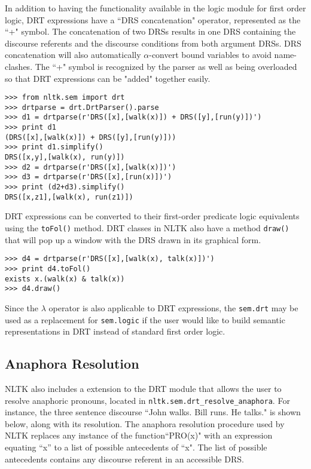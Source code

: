 \documentclass{article}
\newcommand{\dhgdrs}[2]
{
    {
    \it
    \begin{tabular}{|l|}
    \hline
    ~ \vspace{-2ex} \\
    #1
    \\
    ~ \vspace{-2ex} \\
    \hline
    ~ \vspace{-2ex} \\
    #2
    \\
    ~ \\    %
    \hline
    \end{tabular}
    }
}
\newcommand{\dhgcode}[1]{{\tt #1}}
\begin{document}
\enumsentence{\label{drt2}\dhgdrs{j,d}{(John = j)\\dog(d)\\sees(j,d)}}
\enumsentence{\label{drt3}\dhgcode{DRS([j,d],[(John = j), dog(d), sees(j,d)])}}

In addition to having the functionality available in the logic module for first order logic, DRT expressions have a ``DRS concatenation" operator, represented as the ``+" symbol.  The concatenation of two DRSs results in one DRS containing the discourse referents and the discourse conditions from both argument DRSs.  DRS concatenation will also automatically $\alpha$-convert bound variables to avoid name-clashes.  The ``+" symbol is recognized by the parser as well as being overloaded so that DRT expressions can be "added" together easily.

\begin{verbatim}
>>> from nltk.sem import drt
>>> drtparse = drt.DrtParser().parse
>>> d1 = drtparse(r'DRS([x],[walk(x)]) + DRS([y],[run(y)])')
>>> print d1
(DRS([x],[walk(x)]) + DRS([y],[run(y)]))
>>> print d1.simplify()
DRS([x,y],[walk(x), run(y)])
>>> d2 = drtparse(r'DRS([x],[walk(x)])')
>>> d3 = drtparse(r'DRS([x],[run(x)])')
>>> print (d2+d3).simplify()
DRS([x,z1],[walk(x), run(z1)])
\end{verbatim}

DRT expressions can be converted to their first-order predicate logic equivalents using the \dhgcode{toFol()} method.  DRT classes in NLTK also have a method \dhgcode{draw()} that will pop up a window with the DRS drawn in its graphical form.

\begin{verbatim}
>>> d4 = drtparse(r'DRS([x],[walk(x), talk(x)])')
>>> print d4.toFol()
exists x.(walk(x) & talk(x))
>>> d4.draw()
\end{verbatim}

Since the $\lambda$ operator is also applicable to DRT expressions, the \dhgcode{sem.drt} may be used as a replacement for \dhgcode{sem.logic} if the user would like to build semantic representations in DRT instead of standard first order logic.


\subsection{Anaphora Resolution}
NLTK also includes a extension to the DRT module that allows the user to resolve anaphoric pronouns, located in \dhgcode{nltk.sem.drt\_resolve\_anaphora}.  For instance, the three sentence discourse ``John walks.  Bill runs.  He talks." is shown below, along with its resolution.  The anaphora resolution procedure used by NLTK replaces any instance of the function``PRO(x)" with an expression equating ``x'' to a list of possible antecedents of ``x".  The list of possible antecedents contains any discourse referent in an accessible DRS.
\end{document}
